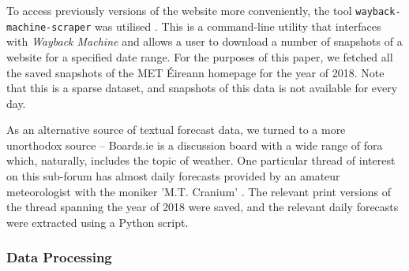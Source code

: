 \documentclass[a4paper,10pt]{article}
\begin{document}
    To access previously versions of the website more conveniently, the tool \texttt{wayback-machine-scraper} was utilised . This is a command-line utility that interfaces with \textit{Wayback Machine} and allows a user to download a number of snapshots of a website for a specified date range. For the purposes of this paper, we fetched all the saved snapshots of the MET \'{E}ireann homepage for the year of 2018. Note that this is a sparse dataset, and snapshots of this data is not available for every day.

    As an alternative source of textual forecast data, we turned to a more unorthodox source -- Boards.ie is a discussion board with a wide range of fora which, naturally, includes the topic of weather. One particular thread of interest on this sub-forum has almost daily forecasts provided by an amateur meteorologist with the moniker 'M.T. Cranium' . The relevant print versions of the thread spanning the year of 2018 were saved, and the relevant daily forecasts were extracted using a Python script. 



    \subsubsection{Data Processing}
\end{document}

